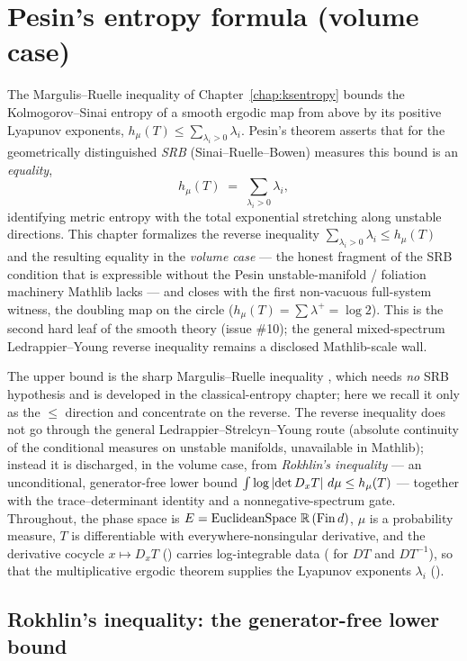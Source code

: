 \chapter{Pesin's entropy formula (volume case)}
\label{chap:pesin}

The Margulis--Ruelle inequality of Chapter~\ref{chap:ksentropy} bounds the Kolmogorov--Sinai
entropy of a smooth ergodic map from above by its positive Lyapunov exponents,
\(h_\mu(T)\le\sum_{\lambda_i>0}\lambda_i\). Pesin's theorem asserts that for the geometrically
distinguished \emph{SRB} (Sinai--Ruelle--Bowen) measures this bound is an \emph{equality},
\[
  h_\mu(T) \;=\; \sum_{\lambda_i>0}\lambda_i ,
\]
identifying metric entropy with the total exponential stretching along unstable directions. This
chapter formalizes the reverse inequality \(\sum_{\lambda_i>0}\lambda_i\le h_\mu(T)\) and the
resulting equality in the \emph{volume case} --- the honest fragment of the SRB condition that is
expressible without the Pesin unstable-manifold / foliation machinery Mathlib lacks --- and closes
with the first non-vacuous full-system witness, the doubling map on the circle
(\(h_\mu(T)=\sum\lambda^{+}=\log 2\)). This is the second hard leaf of the smooth theory (issue
\#10); the general mixed-spectrum Ledrappier--Young reverse inequality remains a disclosed
Mathlib-scale wall.

The upper bound is the sharp Margulis--Ruelle inequality , which needs
\emph{no} SRB hypothesis and is developed in the classical-entropy chapter; here we recall it only
as the \(\le\) direction and concentrate on the reverse. The reverse inequality does not go through
the general Ledrappier--Strelcyn--Young route (absolute continuity of the conditional measures on
unstable manifolds, unavailable in Mathlib); instead it is discharged, in the volume case, from
\emph{Rokhlin's inequality} --- an unconditional, generator-free lower bound
\(\int\log\left\lvert \det D_xT \right\rvert\,d\mu\le h_\mu(T)\) --- together with the trace--determinant identity and
a nonnegative-spectrum gate. Throughout, the phase space is
\(E=\operatorname{EuclideanSpace}\,\mathbb{R}\,(\operatorname{Fin} d)\), \(\mu\) is a probability measure, \(T\) is
differentiable with everywhere-nonsingular derivative, and the derivative cocycle
\(x\mapsto D_xT\) () carries log-integrable data
( for \(DT\) and \(DT^{-1}\)), so that the multiplicative ergodic theorem
supplies the Lyapunov exponents \(\lambda_i\) ().

\section{Rokhlin's inequality: the generator-free lower bound}

